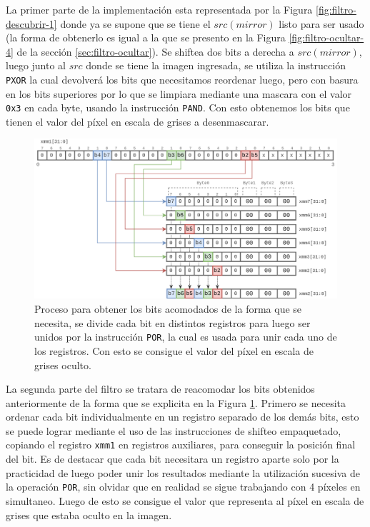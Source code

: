 \documentclass[a4paper]{article}
\begin{document}
La primer parte de la implementación esta representada por la Figura \ref{fig:filtro-descubrir-1} donde ya se supone que se tiene el $src(mirror)$ listo para ser usado (la forma de obtenerlo es igual a la que se presento en la Figura \ref{fig:filtro-ocultar-4} de la sección \ref{sec:filtro-ocultar}). Se shiftea dos bits a derecha a $src(mirror)$, luego junto al $src$ donde se tiene la imagen ingresada, se utiliza la instrucción \texttt{PXOR} la cual devolverá los bits que necesitamos reordenar luego, pero con basura en los bits superiores por lo que se limpiara mediante una mascara con el valor \texttt{0x3} en cada byte, usando la instrucción \texttt{PAND}. Con esto obtenemos los bits que tienen el valor del píxel en escala de grises a desenmascarar.

\begin{figure}[h!]
  \begin{center}
	\includegraphics[scale=0.345]{images/filtro-descubrir-2.png}
	\caption{Proceso para obtener los bits acomodados de la forma que se necesita, se divide cada bit en distintos registros para luego ser unidos por la instrucción \texttt{POR}, la cual es usada para unir cada uno de los registros. Con esto se consigue el valor del píxel en escala de grises oculto.}
 	\label{fig:filtro-descubrir-2}
  \end{center}
\end{figure}



La segunda parte del filtro se tratara de reacomodar los bits obtenidos anteriormente de la forma que se explicita en la Figura \ref{fig:filtro-descubrir-2}. Primero se necesita ordenar cada bit individualmente en un registro separado de los demás bits, esto se puede lograr mediante el uso de las instrucciones de shifteo empaquetado, copiando el registro \texttt{xmm1} en registros auxiliares, para conseguir la posición final del bit. Es de destacar que cada bit necesitara un registro aparte solo por la practicidad de luego poder unir los resultados mediante la utilización sucesiva de la operación \texttt{POR}, sin olvidar que en realidad se sigue trabajando con 4 píxeles en simultaneo. Luego de esto se consigue el valor que representa al píxel en escala de grises que estaba oculto en la imagen.
\end{document}
